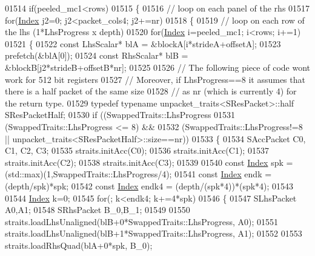 \begin{DoxyCode}
01514     \textcolor{keywordflow}{if}(peeled\_mc1<rows)
01515     \{
01516       \textcolor{comment}{// loop on each panel of the rhs}
01517       \textcolor{keywordflow}{for}(\hyperlink{namespace_eigen_a62e77e0933482dafde8fe197d9a2cfde}{Index} j2=0; j2<packet\_cols4; j2+=nr)
01518       \{
01519         \textcolor{comment}{// loop on each row of the lhs (1*LhsProgress x depth)}
01520         \textcolor{keywordflow}{for}(\hyperlink{namespace_eigen_a62e77e0933482dafde8fe197d9a2cfde}{Index} i=peeled\_mc1; i<rows; i+=1)
01521         \{
01522           \textcolor{keyword}{const} LhsScalar* blA = &blockA[i*strideA+offsetA];
01523           prefetch(&blA[0]);
01524           \textcolor{keyword}{const} RhsScalar* blB = &blockB[j2*strideB+offsetB*nr];
01525 
01526           \textcolor{comment}{// The following piece of code wont work for 512 bit registers}
01527           \textcolor{comment}{// Moreover, if LhsProgress==8 it assumes that there is a half packet of the same size}
01528           \textcolor{comment}{// as nr (which is currently 4) for the return type.}
01529           \textcolor{keyword}{typedef} \textcolor{keyword}{typename} unpacket\_traits<SResPacket>::half SResPacketHalf;
01530           \textcolor{keywordflow}{if} ((SwappedTraits::LhsProgress %
01531               (SwappedTraits::LhsProgress <= 8) &&
01532               (SwappedTraits::LhsProgress!=8 || unpacket\_traits<SResPacketHalf>::size==nr))
01533           \{
01534             SAccPacket C0, C1, C2, C3;
01535             straits.initAcc(C0);
01536             straits.initAcc(C1);
01537             straits.initAcc(C2);
01538             straits.initAcc(C3);
01539 
01540             \textcolor{keyword}{const} \hyperlink{namespace_eigen_a62e77e0933482dafde8fe197d9a2cfde}{Index} spk   = (std::max)(1,SwappedTraits::LhsProgress/4);
01541             \textcolor{keyword}{const} \hyperlink{namespace_eigen_a62e77e0933482dafde8fe197d9a2cfde}{Index} endk  = (depth/spk)*spk;
01542             \textcolor{keyword}{const} \hyperlink{namespace_eigen_a62e77e0933482dafde8fe197d9a2cfde}{Index} endk4 = (depth/(spk*4))*(spk*4);
01543 
01544             \hyperlink{namespace_eigen_a62e77e0933482dafde8fe197d9a2cfde}{Index} k=0;
01545             \textcolor{keywordflow}{for}(; k<endk4; k+=4*spk)
01546             \{
01547               SLhsPacket A0,A1;
01548               SRhsPacket B\_0,B\_1;
01549 
01550               straits.loadLhsUnaligned(blB+0*SwappedTraits::LhsProgress, A0);
01551               straits.loadLhsUnaligned(blB+1*SwappedTraits::LhsProgress, A1);
01552 
01553               straits.loadRhsQuad(blA+0*spk, B\_0);

\end{DoxyCode}

